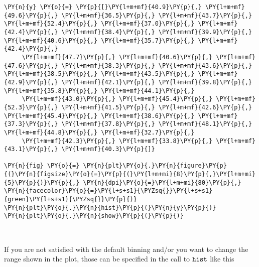     \begin{tcolorbox}[breakable, size=fbox, boxrule=1pt, pad at break*=1mm,colback=cellbackground, colframe=cellborder]
\begin{Verbatim}[commandchars=\\\{\}]
\PY{n}{y} \PY{o}{=} \PY{p}{[}\PY{l+m+mf}{40.9}\PY{p}{,} \PY{l+m+mf}{49.6}\PY{p}{,} \PY{l+m+mf}{36.5}\PY{p}{,} \PY{l+m+mf}{43.7}\PY{p}{,} \PY{l+m+mf}{52.4}\PY{p}{,} \PY{l+m+mf}{37.0}\PY{p}{,} \PY{l+m+mf}{42.4}\PY{p}{,} \PY{l+m+mf}{38.4}\PY{p}{,} \PY{l+m+mf}{39.9}\PY{p}{,} \PY{l+m+mf}{40.6}\PY{p}{,} \PY{l+m+mf}{35.7}\PY{p}{,} \PY{l+m+mf}{42.4}\PY{p}{,} 
     \PY{l+m+mf}{47.7}\PY{p}{,} \PY{l+m+mf}{40.6}\PY{p}{,} \PY{l+m+mf}{47.6}\PY{p}{,} \PY{l+m+mf}{38.3}\PY{p}{,} \PY{l+m+mf}{43.6}\PY{p}{,} \PY{l+m+mf}{38.5}\PY{p}{,} \PY{l+m+mf}{43.5}\PY{p}{,} \PY{l+m+mf}{42.9}\PY{p}{,} \PY{l+m+mf}{42.1}\PY{p}{,} \PY{l+m+mf}{39.8}\PY{p}{,} \PY{l+m+mf}{35.8}\PY{p}{,} \PY{l+m+mf}{44.1}\PY{p}{,} 
     \PY{l+m+mf}{43.0}\PY{p}{,} \PY{l+m+mf}{45.4}\PY{p}{,} \PY{l+m+mf}{52.3}\PY{p}{,} \PY{l+m+mf}{41.5}\PY{p}{,} \PY{l+m+mf}{42.6}\PY{p}{,} \PY{l+m+mf}{45.4}\PY{p}{,} \PY{l+m+mf}{38.6}\PY{p}{,} \PY{l+m+mf}{37.3}\PY{p}{,} \PY{l+m+mf}{37.8}\PY{p}{,} \PY{l+m+mf}{48.1}\PY{p}{,} \PY{l+m+mf}{44.8}\PY{p}{,} \PY{l+m+mf}{32.7}\PY{p}{,} 
     \PY{l+m+mf}{42.3}\PY{p}{,} \PY{l+m+mf}{33.8}\PY{p}{,} \PY{l+m+mf}{43.1}\PY{p}{,} \PY{l+m+mf}{40.3}\PY{p}{]}

\PY{n}{fig} \PY{o}{=} \PY{n}{plt}\PY{o}{.}\PY{n}{figure}\PY{p}{(}\PY{n}{figsize}\PY{o}{=}\PY{p}{(}\PY{l+m+mi}{8}\PY{p}{,}\PY{l+m+mi}{5}\PY{p}{)}\PY{p}{,} \PY{n}{dpi}\PY{o}{=}\PY{l+m+mi}{80}\PY{p}{,} \PY{n}{facecolor}\PY{o}{=}\PY{l+s+s1}{\PYZsq{}}\PY{l+s+s1}{green}\PY{l+s+s1}{\PYZsq{}}\PY{p}{)}
\PY{n}{plt}\PY{o}{.}\PY{n}{hist}\PY{p}{(}\PY{n}{y}\PY{p}{)}
\PY{n}{plt}\PY{o}{.}\PY{n}{show}\PY{p}{(}\PY{p}{)}
\end{Verbatim}
\end{tcolorbox}

    \begin{center}
    \end{center}
    { \hspace*{\fill} \\}
    
    If you are not satisfied with the default binning and/or you want to
change the range shown in the plot, those can be specified in the call
to \(\tt{hist}\) like this


